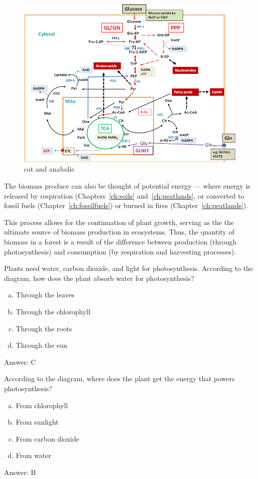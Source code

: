 \begin{figure}
	\centering
\includegraphics[width=.5\textwidth]{graphics/Major-catabolic-and-anabolic-pathways-in-mammalian.png}
	\caption{cat and anabolic}
	\label{fig:Major-catabolic-and-anabolic-pathways-in-mammalian}
\end{figure}

    
The biomass produce can also be thought of potential energy --- where energy is released by respiration (Chapters~\ref{ch:soils} and~\ref{ch:peatlands}, or converted to fossil fuels (Chapter~\ref{ch:fossilfuels}) or burned in fires (Chapter~\ref{ch:peatlands}). 

This process allows for the continuation of plant growth, serving as the the ultimate source of biomass production in ecosystems. Thus, the quantity of biomass in a forest is a result of the difference between production (through photosynthesis) and consumption (by respiration and harvesting processes).



\begin{problem}
  Plants need water, carbon dioxide, and light for photosynthesis. According to the diagram, how does the plant absorb water for photosynthesis? 
\begin{enumerate}[(a)]
    \item Through the leaves
    \item Through the chlorophyll
    \item Through the roots
    \item Through the sun
\end{enumerate}  


\end{problem}

Answer: C

\begin{problem}
According to the diagram, where does the plant get the energy that powers photosynthesis?
\begin{enumerate}[(a)]
\item From chlorophyll
\item From sunlight
\item From carbon dioxide
\item From water
\end{enumerate}  

Answer: B
\end{problem}

